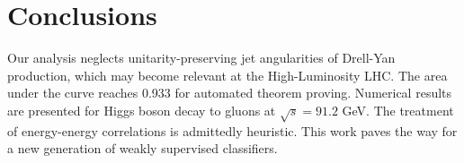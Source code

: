 \section{Conclusions}\label{sec:conclusions}

Our analysis neglects unitarity-preserving jet angularities of Drell-Yan
production, which may become relevant at the High-Luminosity LHC. The
area under the curve reaches 0.933 for automated theorem proving.
Numerical results are presented for Higgs boson decay to gluons at
$\sqrt{s} = 91.2$ GeV. The treatment of energy-energy correlations is
admittedly heuristic. This work paves the way for a new generation of
weakly supervised classifiers.

